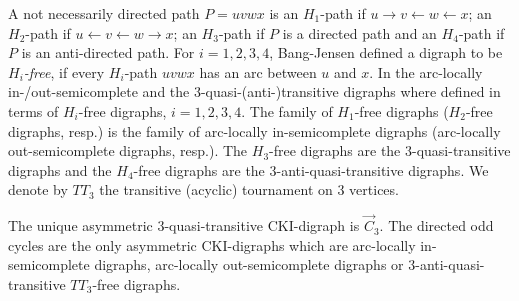 A not necessarily directed path $P=uvwx$ is an $H_1$-path if $u\rightarrow v\leftarrow w\leftarrow x$; an $H_2$-path if  $u\leftarrow v\leftarrow w\rightarrow x$; an $H_3$-path if $P$ is a directed path and an $H_4$-path if $P$ is an anti-directed path.
For $i=1,2,3,4$, Bang-Jensen defined a digraph to be $H_i$\emph{-free}, if every $H_i$-path $uvwx$ has an arc between $u$ and $x$.
In \cite{bang2004structure} the arc-locally in-/out-semicomplete and the $3$-quasi-(anti-)transitive digraphs where  defined in terms of $H_i$-free digraphs, $i=1,2,3,4$.
%
The family of $H_1$-free digraphs ($H_2$-free digraphs, resp.) is the family of arc-locally in-semicomplete digraphs (arc-locally out-semicomplete digraphs, resp.).
The $H_3$-free digraphs are the $3$-quasi-transitive digraphs and
the $H_4$-free digraphs are the $3$-anti-quasi-transitive digraphs. We denote by $TT_3$ the transitive (acyclic) tournament on $3$ vertices.

\begin{teo}\label{T1}
The unique asymmetric $3$-quasi-transitive CKI-digraph is $\overrightarrow{C}_3$. The directed odd cycles are the only asymmetric CKI-digraphs which are arc-locally in-semicomplete digraphs, arc-locally out-semicomplete digraphs or $3$-anti-quasi-transitive $TT_3$-free digraphs.
\end{teo}

